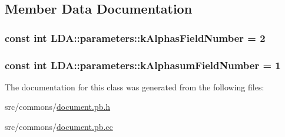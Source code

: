 \subsection{Member Data Documentation}
\hypertarget{class_l_d_a_1_1parameters_a6a022362d3d9f338b2931e15dc0083e5}{
\subsubsection[{kAlphasFieldNumber}]{\setlength{\rightskip}{0pt plus 5cm}const int {\bf LDA::parameters::kAlphasFieldNumber} = 2}}
\label{class_l_d_a_1_1parameters_a6a022362d3d9f338b2931e15dc0083e5}
\hypertarget{class_l_d_a_1_1parameters_a856a5e02027c251c5616752013231231}{
\subsubsection[{kAlphasumFieldNumber}]{\setlength{\rightskip}{0pt plus 5cm}const int {\bf LDA::parameters::kAlphasumFieldNumber} = 1}}
\label{class_l_d_a_1_1parameters_a856a5e02027c251c5616752013231231}


The documentation for this class was generated from the following files:\begin{DoxyCompactItemize}
\item 
src/commons/\hyperlink{document_8pb_8h}{document.pb.h}\item 
src/commons/\hyperlink{document_8pb_8cc}{document.pb.cc}\end{DoxyCompactItemize}
